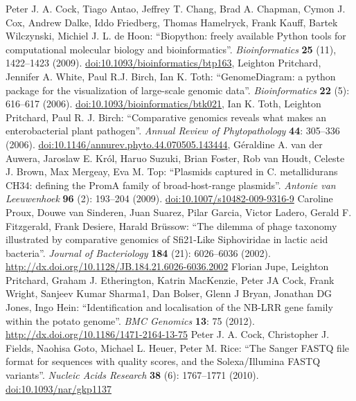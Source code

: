 \documentclass{report}
\begin{document}
\begin{thebibliography}{99}
Peter J. A. Cock, Tiago Antao, Jeffrey T. Chang, Brad A. Chapman, Cymon J. Cox, Andrew Dalke, Iddo Friedberg, Thomas Hamelryck, Frank Kauff, Bartek Wilczynski, Michiel J. L. de Hoon: ``Biopython: freely available Python tools for computational molecular biology and bioinformatics''. {\it Bioinformatics} {\bf 25} (11), 1422--1423 (2009). \href{http://dx.doi.org/10.1093/bioinformatics/btp163}{doi:10.1093/bioinformatics/btp163},
Leighton Pritchard, Jennifer A. White, Paul R.J. Birch, Ian K. Toth: ``GenomeDiagram: a python package for the visualization of large-scale genomic data''.  {\it Bioinformatics} {\bf 22} (5): 616--617 (2006).
\href{http://dx.doi.org/10.1093/bioinformatics/btk021}{doi:10.1093/bioinformatics/btk021},
Ian K. Toth, Leighton Pritchard, Paul R. J. Birch: ``Comparative genomics reveals what makes an enterobacterial plant pathogen''. {\it Annual Review of Phytopathology} {\bf 44}: 305--336 (2006).
\href{http://dx.doi.org/10.1146/annurev.phyto.44.070505.143444}{doi:10.1146/annurev.phyto.44.070505.143444},
G\'eraldine A. van der Auwera, Jaroslaw E. Kr\'ol, Haruo Suzuki, Brian Foster, Rob van Houdt, Celeste J. Brown, Max Mergeay, Eva M. Top: ``Plasmids captured in C. metallidurans CH34: defining the PromA family of broad-host-range plasmids''.
\textit{Antonie van Leeuwenhoek} {\bf 96} (2): 193--204 (2009).
\href{http://dx.doi.org/10.1007/s10482-009-9316-9}{doi:10.1007/s10482-009-9316-9}
Caroline Proux, Douwe van Sinderen, Juan Suarez, Pilar Garcia, Victor Ladero, Gerald F. Fitzgerald, Frank Desiere, Harald Br\"ussow:
``The dilemma of phage taxonomy illustrated by comparative genomics of Sfi21-Like Siphoviridae in lactic acid bacteria''.  \textit{Journal of Bacteriology} {\bf 184} (21): 6026--6036 (2002).
\href{http://dx.doi.org/10.1128/JB.184.21.6026-6036.2002}{http://dx.doi.org/10.1128/JB.184.21.6026-6036.2002}
Florian Jupe, Leighton Pritchard, Graham J. Etherington, Katrin MacKenzie, Peter JA Cock, Frank Wright, Sanjeev Kumar Sharma1, Dan Bolser, Glenn J Bryan, Jonathan DG Jones, Ingo Hein: ``Identification and localisation of the NB-LRR gene family within the potato genome''. \textit{BMC Genomics} {\bf 13}: 75 (2012).
\href{http://dx.doi.org/10.1186/1471-2164-13-75}{http://dx.doi.org/10.1186/1471-2164-13-75}
Peter J. A. Cock, Christopher J. Fields, Naohisa Goto, Michael L. Heuer, Peter M. Rice: ``The Sanger FASTQ file format for sequences with quality scores, and the Solexa/Illumina FASTQ variants''.  \textit{Nucleic Acids Research} {\bf 38} (6): 1767--1771 (2010). \href{http://dx.doi.org/10.1093/nar/gkp1137}{doi:10.1093/nar/gkp1137}

\end{thebibliography}
\end{document}
